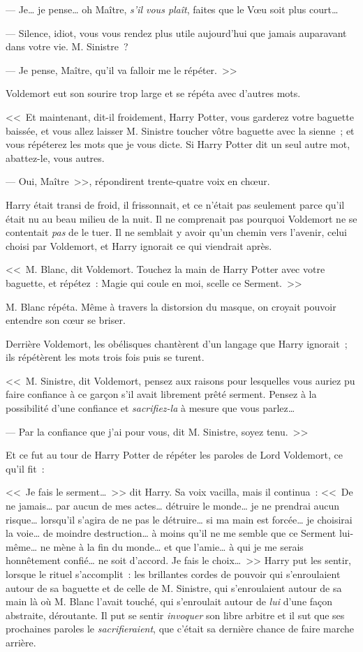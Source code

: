 --- Je… je pense… oh Maître, \emph{s'il vous plaît}, faites que le Vœu soit plus court…

--- Silence, idiot, vous vous rendez plus utile aujourd'hui que jamais auparavant dans votre vie. M. Sinistre~?

--- Je pense, Maître, qu'il va falloir me le répéter.~>>

Voldemort eut son sourire trop large et se répéta avec d'autres mots.

<<~Et maintenant, dit-il froidement, Harry Potter, vous garderez votre baguette baissée, et vous allez laisser M. Sinistre toucher vôtre baguette avec la sienne~; et vous répéterez les mots que je vous dicte. Si Harry Potter dit un seul autre mot, abattez-le, vous autres.

--- Oui, Maître~>>, répondirent trente-quatre voix en chœur.

Harry était transi de froid, il frissonnait, et ce n'était pas seulement parce qu'il était nu au beau milieu de la nuit. Il ne comprenait pas pourquoi Voldemort ne se contentait \emph{pas} de le tuer. Il ne semblait y avoir qu'un chemin vers l'avenir, celui choisi par Voldemort, et Harry ignorait ce qui viendrait après.

<<~M. Blanc, dit Voldemort. Touchez la main de Harry Potter avec votre baguette, et répétez~: Magie qui coule en moi, scelle ce Serment.~>>

M. Blanc répéta. Même à travers la distorsion du masque, on croyait pouvoir entendre son cœur se briser.

Derrière Voldemort, les obélisques chantèrent d'un langage que Harry ignorait~; ils répétèrent les mots trois fois puis se turent.

<<~M. Sinistre, dit Voldemort, pensez aux raisons pour lesquelles vous auriez pu faire confiance à ce garçon s'il avait librement prêté serment. Pensez à la possibilité d'une confiance et \emph{sacrifiez-la} à mesure que vous parlez…

--- Par la confiance que j'ai pour vous, dit M. Sinistre, soyez tenu.~>>

Et ce fut au tour de Harry Potter de répéter les paroles de Lord Voldemort, ce qu'il fit~:

<<~Je fais le serment…~>> dit Harry. Sa voix vacilla, mais il continua~: <<~De ne jamais… par aucun de mes actes… détruire le monde… je ne prendrai aucun risque… lorsqu'il s'agira de ne pas le détruire… si ma main est forcée… je choisirai la voie… de moindre destruction… à moins qu'il ne me semble que ce Serment lui-même… ne mène à la fin du monde… et que l'amie… à qui je me serais honnêtement confié… ne soit d'accord. Je fais le choix…~>> Harry put les sentir, lorsque le rituel s'accomplit~: les brillantes cordes de pouvoir qui s'enroulaient autour de sa baguette et de celle de M. Sinistre, qui s'enroulaient autour de sa main là où M. Blanc l'avait touché, qui s'enroulait autour de \emph{lui} d'une façon abstraite, déroutante. Il put se sentir \emph{invoquer} son libre arbitre et il sut que ses prochaines paroles le \emph{sacrifieraient}, que c'était sa dernière chance de faire marche arrière.

